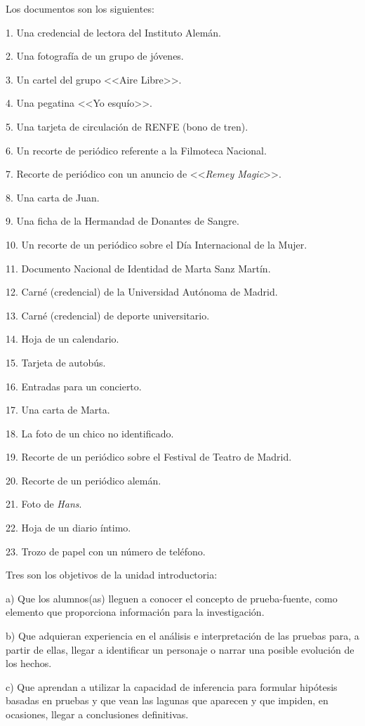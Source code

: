 Los documentos son los siguientes: 
\begin{Obs}
\item[1.] Una credencial de lectora del Instituto
Alemán. 
\item[2.] Una fotografía de un grupo de jóvenes. 
\item[3.] Un cartel del grupo <<Aire
Libre>>. 
\item[4.] Una pegatina <<Yo esquío>>.  
\item[5.] Una tarjeta de circulación de RENFE
(bono de tren). 
\item[6.] Un recorte de periódico referente a la Filmoteca Nacional.
\item[7.] Recorte de periódico con un anuncio de <<\textit{Remey Magic}>>. 
\item[8.] Una carta de Juan. 
\item[9.] Una ficha de la Hermandad de Donantes de Sangre. 
\item[10.] Un recorte de
un periódico sobre el Día Internacional de la Mujer. 
\item[11.] Documento Nacional de
Identidad de Marta Sanz Martín. 
\item[12.] Carné (credencial) de la Universidad
Autónoma de Madrid. 
\item[13.] Carné (credencial) de deporte universitario. 
\item[14.] Hoja de un calendario. 
\item[15.] Tarjeta de autobús. 
\item[16.] Entradas para un concierto. 
\item[17.] Una carta de Marta. 
\item[18.] La foto de un chico no identificado. 
\item[19.] Recorte de un
periódico sobre el Festival de Teatro de Madrid. 
\item[20.] Recorte de un periódico
alemán. 
\item[21.] Foto de \textit{Hans}. 
\item[22.] Hoja de un diario íntimo. 
\item[23.] Trozo de papel con un número de teléfono.
\end{Obs}
 
Tres son los objetivos de la unidad introductoria: 
\begin{Obs}
\item[a)] Que los 
alumnos(as) lleguen a conocer el concepto de prueba-fuente, como 
elemento que proporciona información para la investigación. 
\item[b)] Que 
adquieran experiencia en el análisis e interpretación de las pruebas 
para, a partir de ellas, llegar a identificar un personaje o narrar una 
posible evolución de los hechos. 
\item[c)] Que aprendan a utilizar la 
capacidad de inferencia para formular hipótesis basadas en pruebas y 
que vean las lagunas que aparecen y que impiden, en ocasiones, llegar a 
conclusiones definitivas.
\end{Obs}
 

